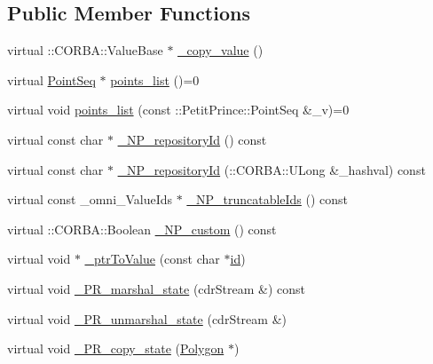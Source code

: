 \subsection*{Public Member Functions}
\begin{DoxyCompactItemize}
\item 
virtual \+::C\+O\+R\+B\+A\+::\+Value\+Base $\ast$ \hyperlink{class_polygon_a888040e806bf0a66186281a89bfd1e50}{\+\_\+copy\+\_\+value} ()
\item 
virtual \hyperlink{class_point_seq}{Point\+Seq} $\ast$ \hyperlink{class_polygon_a09ff655ef2cb86362832e68bf5f2d74a}{points\+\_\+list} ()=0
\item 
virtual void \hyperlink{class_polygon_aac9733780aeb82d8c52a3782d6ac9ea1}{points\+\_\+list} (const \+::Petit\+Prince\+::\+Point\+Seq \&\+\_\+v)=0
\item 
virtual const char $\ast$ \hyperlink{class_polygon_a95a6b4967ce579d1405de9061a7c7b91}{\+\_\+\+N\+P\+\_\+repository\+Id} () const 
\item 
virtual const char $\ast$ \hyperlink{class_polygon_a52b08c50329f4d0c8c89eacede7a2adc}{\+\_\+\+N\+P\+\_\+repository\+Id} (\+::C\+O\+R\+B\+A\+::\+U\+Long \&\+\_\+hashval) const 
\item 
virtual const \+\_\+omni\+\_\+\+Value\+Ids $\ast$ \hyperlink{class_polygon_a169c4ae5faf3b5d8514cd4aa5ccf8a47}{\+\_\+\+N\+P\+\_\+truncatable\+Ids} () const 
\item 
virtual \+::C\+O\+R\+B\+A\+::\+Boolean \hyperlink{class_polygon_ab6de4781af8430d79d65cbc17a07cede}{\+\_\+\+N\+P\+\_\+custom} () const 
\item 
virtual void $\ast$ \hyperlink{class_polygon_a3a92b1e0e80c8fdc33e0f2788321f314}{\+\_\+ptr\+To\+Value} (const char $\ast$\hyperlink{class_draw_a50509da989141b00a5ae22d68a4d5856}{id})
\item 
virtual void \hyperlink{class_polygon_a914894e25e18b467be8f5c3050b0bcbe}{\+\_\+\+P\+R\+\_\+marshal\+\_\+state} (cdr\+Stream \&) const 
\item 
virtual void \hyperlink{class_polygon_a991333f1f730256d07552568fa175780}{\+\_\+\+P\+R\+\_\+unmarshal\+\_\+state} (cdr\+Stream \&)
\item 
virtual void \hyperlink{class_polygon_a884210bc08f053ae5951e719fccbfe14}{\+\_\+\+P\+R\+\_\+copy\+\_\+state} (\hyperlink{class_polygon}{Polygon} $\ast$)
\end{DoxyCompactItemize}

